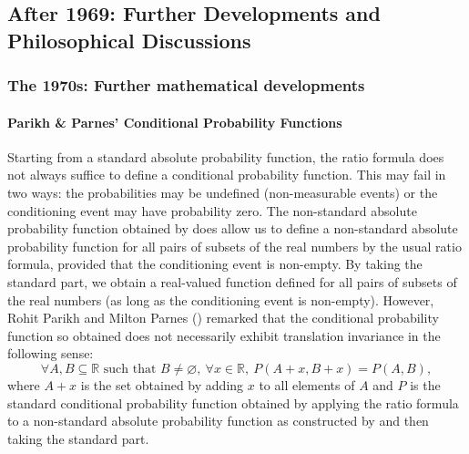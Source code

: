 \subsection{After 1969: Further Developments and Philosophical Discussions}
\subsubsection*{The 1970s: Further mathematical developments}
\paragraph{Parikh \& Parnes' Conditional Probability Functions}
Starting from a standard absolute probability function, the ratio formula does not always suffice to define a conditional probability function. This may fail in two ways: the probabilities may be undefined (non-measurable events) or the conditioning event may have probability zero.
The non-standard absolute probability function obtained by \citet{BernsteinWattenberg:1969} does allow us to define a non-standard absolute probability function for all pairs of subsets of the real numbers by the usual ratio formula, provided that the conditioning event is non-empty. By taking the standard part, we obtain a real-valued function defined for all pairs of subsets of the real numbers (as long as the conditioning event is non-empty).
However, Rohit Parikh and Milton Parnes () remarked that the conditional probability function so obtained does not necessarily exhibit translation invariance in the following sense:
$$\forall A,B \subseteq \mathbb{R} \textrm{\ such\ that\ } B \neq \varnothing, \ \forall x \in \mathbb{R}, \ P(A+x,B+x)=P(A,B),$$
where $A+x$ is the set obtained by adding $x$ to all elements of $A$ and $P$ is the standard conditional probability function obtained by applying the ratio formula to a non-standard absolute probability function as constructed by \citet{BernsteinWattenberg:1969} and then taking the standard part.

